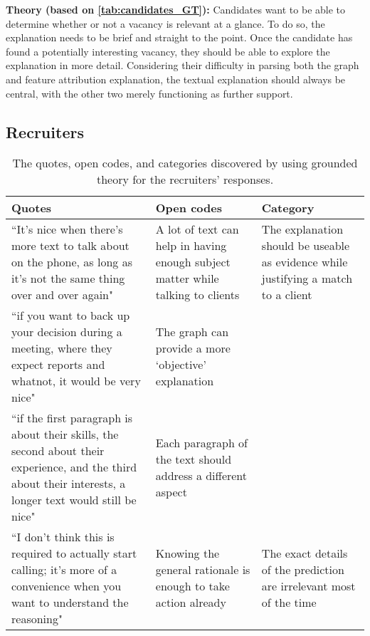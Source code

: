 \noindent \textbf{Theory (based on \cref{tab:candidates_GT}):} Candidates want to be able to determine whether or not a vacancy is relevant at a glance. To do so, the explanation needs to be brief and straight to the point. Once the candidate has found a potentially interesting vacancy, they should be able to explore the explanation in more detail. Considering their difficulty in parsing both the graph and feature attribution explanation, the textual explanation should always be central, with the other two merely functioning as further support. 

\newpage

\subsection{Recruiters}
\begin{table*}[]
\captionsetup{width=1.5\textwidth}
\caption{The quotes, open codes, and categories discovered by using grounded theory for the recruiters' responses.}
\footnotesize
\begin{adjustwidth}{-2.5in}{-2.5in}
\centering
\begin{tabularx}{1.5\textwidth}{@{}X>{\raggedright\arraybackslash}p{6.5cm}>{\raggedright\arraybackslash}p{3.5cm}@{}}
\toprule
\textbf{Quotes} &
  \textbf{Open codes} &
  \textbf{Category} \\ \midrule
``It's nice when there's more text to talk about on the phone, as long as it's not the same thing over and over again" &
  A lot of text can help in having enough subject matter while talking to clients &
  The explanation should be useable as evidence while justifying a match to a client \\ \cmidrule(r){1-1}
``if you want to back up your decision during a meeting, where they expect reports and whatnot, it would be very nice" &
  The graph can provide a more `objective' explanation &
   \\ \cmidrule(r){1-1}
``if the first paragraph is about their skills, the second about their experience, and the third about their interests, a longer text would still be nice" &
  Each paragraph of the text should address a different aspect &
   \\ \midrule
``I don't think this is required to actually start calling; it's more of a convenience when you want to understand the reasoning" &
  Knowing the general rationale is enough to take action already &
  The exact details of the prediction are irrelevant most of the time \\ \cmidrule(r){1-1}

\end{tabularx}
\end{adjustwidth}
\end{table*}
